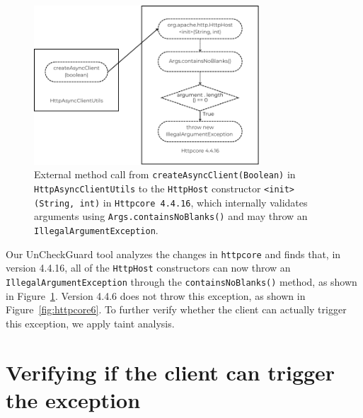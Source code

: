 \begin{figure}[htbp]
    \centering
    \includegraphics[width=0.75\textwidth]{diagram/httpcore16.png}
    \caption{External method call from \texttt{createAsyncClient(Boolean)} in \texttt{HttpAsyncClientUtils} to the \texttt{HttpHost} constructor \texttt{<init>(String, int)} in \texttt{Httpcore 4.4.16}, which internally validates arguments using \texttt{Args.containsNoBlanks()} and may throw an \texttt{IllegalArgumentException}.}
    \label{fig:httpcore16}
\end{figure}

Our UnCheckGuard tool analyzes the changes in \texttt{httpcore} and finds that, in version 4.4.16, all of the \texttt{HttpHost} constructors can now throw an \texttt{IllegalArgumentException} through the \texttt{containsNoBlanks()} method, as shown in Figure~\ref{fig:httpcore16}. Version 4.4.6 does not throw this exception, as shown in Figure~\ref{fig:httpcore6}. To further verify whether the client can actually trigger this exception, we apply taint analysis.

\section{Verifying if the client can trigger the exception}


